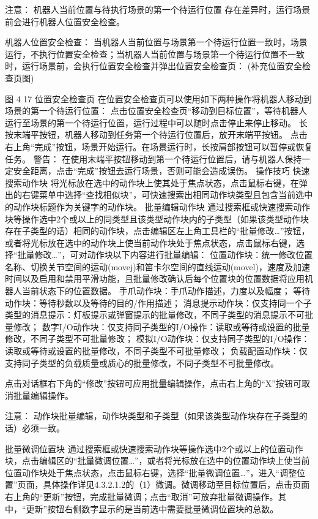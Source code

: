  	注意：
机器人当前位置与待执行场景的第一个待运行位置 存在差异时，运行场景前会进行机器人位置安全检查。

机器人位置安全检查：
当机器人当前位置与场景第一个待运行位置一致时，场景运行，不执行位置安全检查；当机器人当前位置与场景第一个待运行位置不一致时，运行场景前，会执行位置安全检查并弹出位置安全检查页：
(补充位置安全检查页图)
 
图 4 17 位置安全检查页
在位置安全检查页可以使用如下两种操作将机器人移动到场景的第一个待运行位置：
点击位置安全检查页“移动到目标位置”，等待机器人运行至场景的第一个待运行位置，运行过程中可以随时点击停止来停止移动。
长按末端平按钮，机器人移动到任务第一个待运行位置后，放开末端平按钮。
点击右上角“完成”按钮，场景开始运行。在场景运行时，长按肩部按钮可以暂停或恢复任务。
 	警告：
在使用末端平按钮移动到第一个待运行位置后，请与机器人保持一定安全距离，点击“完成”按钮去运行场景，否则可能会造成误伤。
操作技巧
快速搜索动作块
将光标放在选中的动作块上使其处于焦点状态，点击鼠标右键，在弹出的右键菜单中选择“查找相似块”，可快速搜索出相同动作块类型且包含当前选中的动作块标题作为关键字的动作块。
批量编辑动作块
通过搜索框或快速搜索动作块等操作选中2个或以上的同类型且该类型动作块内的子类型（如果该类型动作块存在子类型的话）相同的动作块，点击编辑区左上角工具栏的“批量修改…”按钮，或者将光标放在选中的动作块上使当前动作块处于焦点状态，点击鼠标右键，选择“批量修改…”，可对动作块以下内容进行批量编辑：
位置动作块：统一修改位置名称、切换关节空间的运动(movej)和笛卡尔空间的直线运动(movel)，速度及加速时间以及启用和禁用平滑功能，且批量修改确认后每个位置块的位置数据将应用机器人当前状态下的位置数据。
手爪动作块：手爪动作描述，力度以及幅度；
等待动作块：等待秒数以及等待的目的/作用描述；
消息提示动作块：仅支持同一个子类型的消息提示：灯板提示或弹窗提示的批量修改，不同子类型的消息提示不可批量修改；
	数字I/O动作块：仅支持同子类型的I/O操作：读取或等待或设置的批量修改，不同子类型不可批量修改；
	模拟I/O动作块：仅支持同子类型的I/O操作：读取或等待或设置的批量修改，不同子类型不可批量修改；
	负载配置动作块：仅支持同子类型的负载质量或质心的批量修改，不同子类型不可批量修改。

点击对话框右下角的“修改”按钮可应用批量编辑操作，点击右上角的“X”按钮可取消批量编辑操作。

 	注意：
动作块批量编辑，动作块类型和子类型（如果该类型动作块存在子类型的话）必须一致。


批量微调位置块
通过搜索框或快速搜索动作块等操作选中2个或以上的位置动作块，点击编辑区的“批量微调位置…”，或者将光标放在选中的位置动作块上使当前位置动作块处于焦点状态，点击鼠标右键，选择“批量微调位置…”，进入“调整位置”页面，具体操作详见4.3.2.1.2的（1）微调。微调移动至目标位置后，点击页面右上角的“更新”按钮，完成批量微调；点击“取消”可放弃批量微调操作。其中，“更新”按钮右侧数字显示的是当前选中需要批量微调位置块的总数。
 
